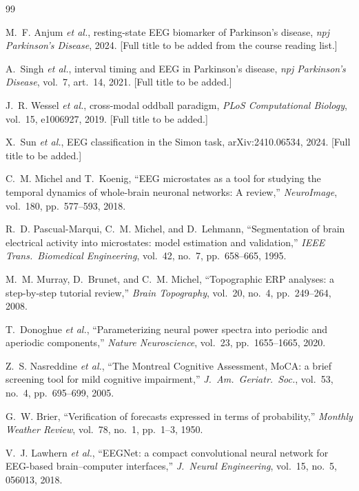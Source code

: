 \documentclass[11pt,a4paper]{article}
\begin{document}
\begin{thebibliography}{99}\small

 M.~F. Anjum \emph{et al.}, resting-state EEG biomarker of Parkinson's disease, \emph{npj Parkinson's Disease}, 2024. [Full title to be added from the course reading list.]

 A.~Singh \emph{et al.}, interval timing and EEG in Parkinson's disease, \emph{npj Parkinson's Disease}, vol.~7, art.~14, 2021. [Full title to be added.]

 J.~R. Wessel \emph{et al.}, cross-modal oddball paradigm, \emph{PLoS Computational Biology}, vol.~15, e1006927, 2019. [Full title to be added.]

 X.~Sun \emph{et al.}, EEG classification in the Simon task, arXiv:2410.06534, 2024. [Full title to be added.]

 C.~M. Michel and T.~Koenig, ``EEG microstates as a tool for studying the temporal dynamics of whole-brain neuronal networks: A review,'' \emph{NeuroImage}, vol.~180, pp.~577--593, 2018.

 R.~D. Pascual-Marqui, C.~M. Michel, and D.~Lehmann, ``Segmentation of brain electrical activity into microstates: model estimation and validation,'' \emph{IEEE Trans.\ Biomedical Engineering}, vol.~42, no.~7, pp.~658--665, 1995.

 M.~M. Murray, D.~Brunet, and C.~M. Michel, ``Topographic ERP analyses: a step-by-step tutorial review,'' \emph{Brain Topography}, vol.~20, no.~4, pp.~249--264, 2008.

 T.~Donoghue \emph{et al.}, ``Parameterizing neural power spectra into periodic and aperiodic components,'' \emph{Nature Neuroscience}, vol.~23, pp.~1655--1665, 2020.

 Z.~S. Nasreddine \emph{et al.}, ``The Montreal Cognitive Assessment, MoCA: a brief screening tool for mild cognitive impairment,'' \emph{J.\ Am.\ Geriatr.\ Soc.}, vol.~53, no.~4, pp.~695--699, 2005.

 G.~W. Brier, ``Verification of forecasts expressed in terms of probability,'' \emph{Monthly Weather Review}, vol.~78, no.~1, pp.~1--3, 1950.

 V.~J. Lawhern \emph{et al.}, ``EEGNet: a compact convolutional neural network for EEG-based brain--computer interfaces,'' \emph{J.\ Neural Engineering}, vol.~15, no.~5, 056013, 2018.


\end{thebibliography}
\end{document}
